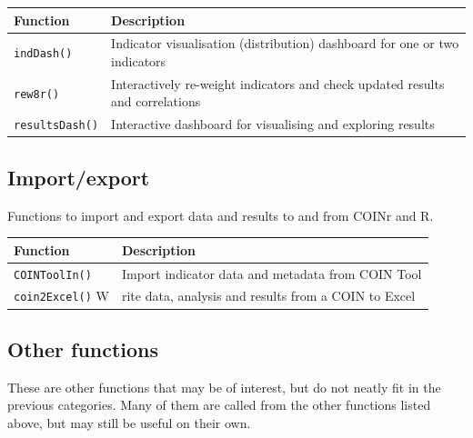 \documentclass[
]{book}
\begin{document}
\begin{longtable}[]{@{}ll@{}}
\toprule
Function & Description \\
\midrule
\endhead
\texttt{indDash()} & Indicator visualisation (distribution) dashboard for one or two indicators \\
\texttt{rew8r()} & Interactively re-weight indicators and check updated results and correlations \\
\texttt{resultsDash()} & Interactive dashboard for visualising and exploring results \\
\bottomrule
\end{longtable}

\hypertarget{importexport}{%
\subsection{Import/export}\label{importexport}}

Functions to import and export data and results to and from COINr and R.

\begin{longtable}[]{@{}ll@{}}
\toprule
Function & Description \\
\midrule
\endhead
\texttt{COINToolIn()} & Import indicator data and metadata from COIN Tool \\
\texttt{coin2Excel()} W & rite data, analysis and results from a COIN to Excel \\
\bottomrule
\end{longtable}

\hypertarget{other-functions}{%
\subsection{Other functions}\label{other-functions}}

These are other functions that may be of interest, but do not neatly fit in the previous categories. Many of them are called from the other functions listed above, but may still be useful on their own.
\end{document}
